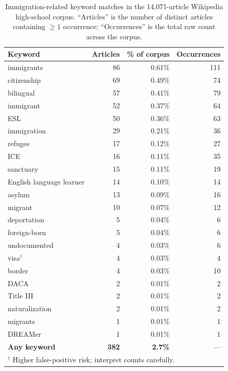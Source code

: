 \documentclass[11pt]{article}
\begin{document}
\begin{table}[H]
  \centering
  \footnotesize
  \setlength{\tabcolsep}{1.5pt}
  \begin{tabular}{lrrr}
  \toprule
  Keyword & Articles & \% of corpus & Occurrences \\
  \midrule
    immigrants               & 86  & 0.61\% & 111 \\
    citizenship              & 69  & 0.49\% &  74 \\
    bilingual                & 57  & 0.41\% &  79 \\
    immigrant                & 52  & 0.37\% &  64 \\
    ESL                      & 50  & 0.36\% &  63 \\
    immigration              & 29  & 0.21\% &  36 \\
    refugee                  & 17  & 0.12\% &  27 \\
    ICE                      & 16  & 0.11\% &  35 \\
    sanctuary                & 15  & 0.11\% &  19 \\
    English language learner & 14  & 0.10\% &  14 \\
    asylum                   & 13  & 0.09\% &  16 \\
    migrant                  & 10  & 0.07\% &  12 \\
    deportation              &  5  & 0.04\% &   6 \\
    foreign-born             &  5  & 0.04\% &   6 \\
    undocumented             &  4  & 0.03\% &   6 \\
    visa$^\dagger$           &  4  & 0.03\% &   4 \\
    border                   &  4  & 0.03\% &  10 \\
    DACA                     &  2  & 0.01\% &   2 \\
    Title III                &  2  & 0.01\% &   2 \\
    naturalization           &  2  & 0.01\% &   2 \\
    migrants                 &  1  & 0.01\% &   1 \\
    DREAMer                  &  1  & 0.01\% &   1 \\
    \midrule
    \textbf{Any keyword}     & \textbf{382} & \textbf{2.7\%} & --- \\
    \bottomrule
    \multicolumn{4}{l}{\footnotesize $^\dagger$ Higher false-positive risk; interpret counts carefully.} \\
  \end{tabular}
  \caption{Immigration-related keyword matches in the 14{,}071-article Wikipedia high-school corpus. ``Articles'' is the number of distinct articles containing $\geq 1$ occurrence; ``Occurrences'' is the total raw count across the corpus.}
  \label{tab:wiki_immigration_keywords}
\end{table}
\end{document}
